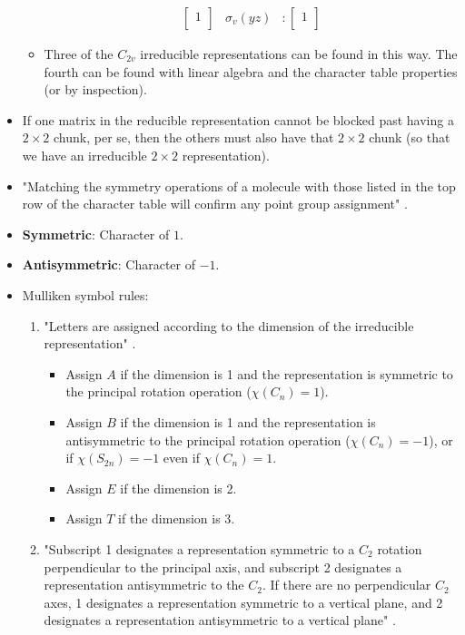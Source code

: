 \documentclass[../notes.tex]{subfiles}
\begin{document}
\begin{itemize}
\begin{itemize}
\begin{align*}
\begin{bmatrix}
                        1\\
                    \end{bmatrix}&
                        \sigma_v(yz) &:
                        \begin{bmatrix}
                            1\\
                        \end{bmatrix}
        \end{align*}
        \item Three of the $C_{2v}$ irreducible representations can be found in this way. The fourth can be found with linear algebra and the character table properties (or by inspection).
    \end{itemize}
    \item If one matrix in the reducible representation cannot be blocked past having a $2\times 2$ chunk, per se, then the others must also have that $2\times 2$ chunk (so that we have an irreducible $2\times 2$ representation).
    \item "Matching the symmetry operations of a molecule with those listed in the top row of the character table will confirm any point group assignment" \parencite[99]{bib:MiesslerFischerTarr}.
    \item \textbf{Symmetric}: Character of $1$.
    \item \textbf{Antisymmetric}: Character of $-1$.
    \item Mulliken symbol rules:
    \begin{enumerate}
        \item "Letters are assigned according to the dimension of the irreducible representation" \parencite[99]{bib:MiesslerFischerTarr}.
        \begin{itemize}
            \item Assign $A$ if the dimension is 1 and the representation is symmetric to the principal rotation operation ($\chi(C_n)=1$).
            \item Assign $B$ if the dimension is 1 and the representation is antisymmetric to the principal rotation operation ($\chi(C_n)=-1$), or if $\chi(S_{2n})=-1$ even if $\chi(C_n)=1$.
            \item Assign $E$ if the dimension is 2.
            \item Assign $T$ if the dimension is 3.
        \end{itemize}
        \item "Subscript 1 designates a representation symmetric to a $C_2$ rotation perpendicular to the principal axis, and subscript 2 designates a representation antisymmetric to the $C_2$. If there are no perpendicular $C_2$ axes, 1 designates a representation symmetric to a vertical plane, and 2 designates a representation antisymmetric to a vertical plane" \parencite[100]{bib:MiesslerFischerTarr}.

\end{enumerate}
\end{itemize}
\end{document}
